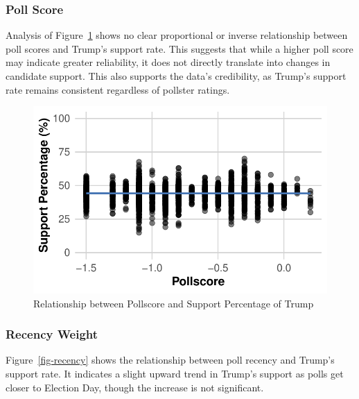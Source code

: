 \documentclass[
  letterpaper,
  DIV=11,
  numbers=noendperiod]{scrartcl}
\begin{document}
\hypertarget{poll-score}{%
\subsubsection{Poll Score}\label{poll-score}}

Analysis of Figure~\ref{fig-Pollscore} shows no clear proportional or
inverse relationship between poll scores and Trump's support rate. This
suggests that while a higher poll score may indicate greater
reliability, it does not directly translate into changes in candidate
support. This also supports the data's credibility, as Trump's support
rate remains consistent regardless of pollster ratings.

\begin{figure}

{\centering \includegraphics{Insights-and-Predictions-for-the-U.S.-Election_files/figure-pdf/fig-Pollscore-1.pdf}

}

\caption{\label{fig-Pollscore}Relationship between Pollscore and Support
Percentage of Trump}

\end{figure}

\hypertarget{recency-weight}{%
\subsubsection{Recency Weight}\label{recency-weight}}

Figure~\ref{fig-recency} shows the relationship between poll recency and
Trump's support rate. It indicates a slight upward trend in Trump's
support as polls get closer to Election Day, though the increase is not
significant.
\end{document}
